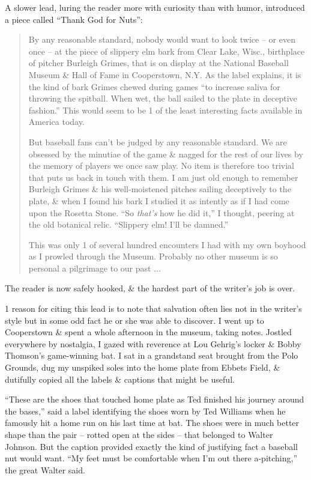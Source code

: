 \documentclass{article}
\begin{document}
A slower lead, luring the reader more with curiosity than with humor, introduced a piece called ``Thank God for Nuts'':
\begin{quotation}
	By any reasonable standard, nobody would want to look twice -- or even once -- at the piece of slippery elm bark from Clear Lake, Wisc., birthplace of pitcher Burleigh Grimes, that is on display at the National Baseball Museum \& Hall of Fame in Cooperstown, N.Y. As the label explains, it is the kind of bark Grimes chewed during games ``to increase saliva for throwing the spitball. When wet, the ball sailed to the plate in deceptive fashion.'' This would seem to be 1 of the least interesting facts available in America today.
	
	But baseball fans can't be judged by any reasonable standard. We are obsessed by the minutiae of the game \& nagged for the rest of our lives by the memory of players we once saw play. No item is therefore too trivial that puts us back in touch with them. I am just old enough to remember Burleigh Grimes \& his well-moistened pitches sailing deceptively to the plate, \& when I found his bark I studied it as intently as if I had come upon the Rosetta Stone. ``So \textit{that's} how he did it,'' I thought, peering at the old botanical relic. ``Slippery elm! I'll be damned.''
	
	This was only 1 of several hundred encounters I had with my own boyhood as I prowled through the Museum. Probably no other museum is so personal a pilgrimage to our past $\ldots$
\end{quotation}
The reader is now safely hooked, \& the hardest part of the writer's job is over.

1 reason for citing this lead is to note that salvation often lies not in the writer's style but in some odd fact he or she was able to discover. I went up to Cooperstown \& spent a whole afternoon in the museum, taking notes. Jostled everywhere by nostalgia, I gazed with reverence at Lou Gehrig's locker \& Bobby Thomson's game-winning bat. I sat in a grandstand seat brought from the Polo Grounds, dug my unspiked soles into the home plate from Ebbets Field, \& dutifully copied all the labels \& captions that might be useful.

``These are the shoes that touched home plate as Ted finished his journey around the bases,'' said a label identifying the shoes worn by Ted Williams when he famously hit a home run on his last time at bat. The shoes were in much better shape than the pair -- rotted open at the sides -- that belonged to Walter Johnson. But the caption provided exactly the kind of justifying fact a baseball nut would want. ``My feet must be comfortable when I'm out there a-pitching,'' the great Walter said.
\end{document}
